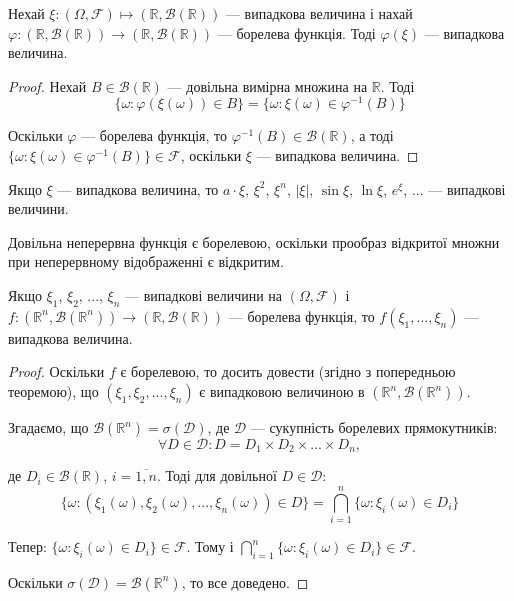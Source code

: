\begin{theorem}
    Нехай $\xi: (\Omega, \mathcal{F}) \mapsto (\mathbb{R}, \mathcal{B}(\mathbb{R}))$
    --- випадкова величина і нахай
    $\varphi: (\mathbb{R}, \mathcal{B}(\mathbb{R})) \rightarrow (\mathbb{R}, \mathcal{B}(\mathbb{R}))$
    --- борелева функція.
    Тоді $\varphi(\xi)$ --- випадкова величина.
\end{theorem}
\begin{proof}
    Нехай $B \in \mathcal{B}(\mathbb{R})$ --- довільна вимірна множина на $\mathbb{R}$. Тоді 
    $$\{\omega: \varphi(\xi(\omega)) \in B\}
    = \{\omega: \xi(\omega) \in \varphi^{-1}(B) \}$$
    
    Оскільки $\varphi$ --- борелева функція, то $\varphi^{-1}(B) \in \mathcal{B}(\mathbb{R})$,
    а тоді $\{\omega: \xi(\omega) \in \varphi^{-1}(B)\} \in \mathcal{F}$, 
    оскільки $\xi$ --- випадкова величина.    
\end{proof}

\begin{corollary}
    Якщо $\xi$ --- випадкова величина, то $a \cdot \xi$, $\xi^2$, $\xi^n$, $|\xi|$,
    $\sin \xi$, $\ln \xi$, $e^{\xi}$, ...  --- випадкові величини.    
\end{corollary}

\begin{remark}
    Довільна  неперервна  функція є борелевою, оскільки прообраз
    відкритої множни при неперервному відображенні є відкритим.
\end{remark}

\begin{theorem}
    Якщо $\xi_1$, $\xi_2$, ..., $\xi_n$ --- випадкові величини на $(\Omega, \mathcal{F})$ і
    $f: (\mathbb{R}^n, \mathcal{B}(\mathbb{R}^n)) \rightarrow (\mathbb{R}, \mathcal{B}(\mathbb{R}))$
    --- борелева функція, то $f(\xi_1, ..., \xi_n)$ --- випадкова величина.
\end{theorem}
\begin{proof}
    Оскільки $f$ є борелевою, то досить довести (згідно з попередньою 
    теоремою), що $(\xi_1, \xi_2, ..., \xi_n)$ є випадковою величиною в
    $(\mathbb{R}^n, \mathcal{B}(\mathbb{R}^n))$.
    
    Згадаємо, що $\mathcal{B}(\mathbb{R}^n) = \sigma(\mathcal{D})$, де
    $\mathcal{D}$ --- сукупність борелевих прямокутників:
    $$\forall D \in \mathcal{D}: D = D_1 \times D_2 \times ... \times D_n,$$
    
    де $D_i \in \mathcal{B}(\mathbb{R})$, $i = \overline{1, n}$.
    Тоді для довільної $D \in \mathcal{D}$:
    $$\{\omega: (\xi_1(\omega), \xi_2(\omega), ..., \xi_n(\omega)) \in D\}
    = \bigcap\limits_{i=1}^{n} \{\omega: \xi_i(\omega) \in D_i\}$$
    
    Тепер: $\{\omega: \xi_i(\omega) \in D_i\} \in \mathcal{F}$. Тому і
    $\bigcap\limits_{i=1}^{n} \{\omega: \xi_i(\omega) \in D_i\} \in \mathcal{F}$. 
    
    Оскільки $\sigma(\mathcal{D}) = \mathcal{B}(\mathbb{R}^n)$, то все доведено.
\end{proof}

